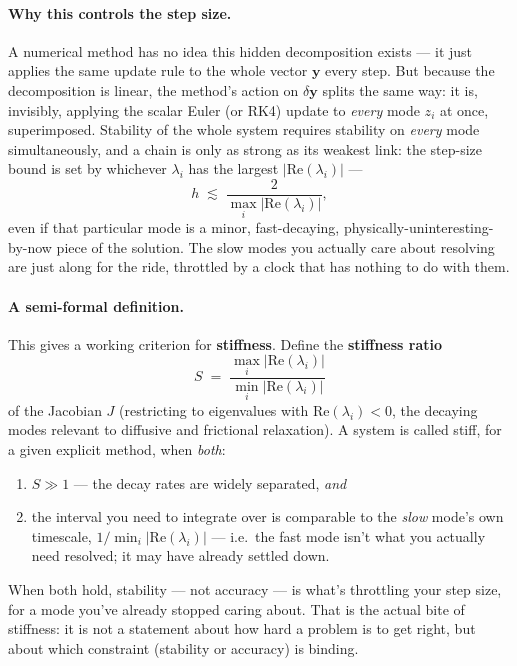 \paragraph{Why this controls the step size.} A numerical method has no idea this hidden decomposition exists --- it just applies the same update rule to the whole vector $\mathbf y$ every step. But because the decomposition is linear, the method's action on $\delta\mathbf y$ splits the same way: it is, invisibly, applying the scalar Euler (or RK4) update to \emph{every} mode $z_i$ at once, superimposed. Stability of the whole system requires stability on \emph{every} mode simultaneously, and a chain is only as strong as its weakest link: the step-size bound is set by whichever $\lambda_i$ has the largest $|\mathrm{Re}(\lambda_i)|$ ---
\begin{equation}
h \;\lesssim\; \frac{2}{\max_i |\mathrm{Re}(\lambda_i)|},
\end{equation}
even if that particular mode is a minor, fast-decaying, physically-uninteresting-by-now piece of the solution. The slow modes you actually care about resolving are just along for the ride, throttled by a clock that has nothing to do with them.

\paragraph{A semi-formal definition.} This gives a working criterion for \textbf{stiffness}. Define the \textbf{stiffness ratio}
\begin{equation}
S \;=\; \frac{\max_i |\mathrm{Re}(\lambda_i)|}{\min_i |\mathrm{Re}(\lambda_i)|}
\end{equation}
of the Jacobian $J$ (restricting to eigenvalues with $\mathrm{Re}(\lambda_i)<0$, the decaying modes relevant to diffusive and frictional relaxation). A system is called stiff, for a given explicit method, when \emph{both}:
\begin{enumerate}[label=(\roman*)]
\item $S \gg 1$ --- the decay rates are widely separated, \emph{and}
\item the interval you need to integrate over is comparable to the \emph{slow} mode's own timescale, $1/\min_i|\mathrm{Re}(\lambda_i)|$ --- i.e.\ the fast mode isn't what you actually need resolved; it may have already settled down.
\end{enumerate}
When both hold, stability --- not accuracy --- is what's throttling your step size, for a mode you've already stopped caring about. That is the actual bite of stiffness: it is not a statement about how hard a problem is to get right, but about which constraint (stability or accuracy) is binding.

